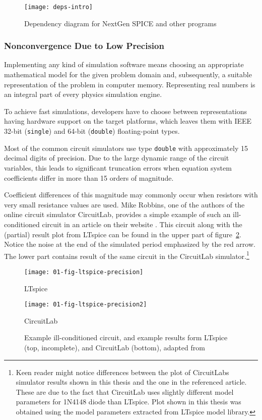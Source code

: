 \begin{figure}[h]
	\centering
	\texttt{[image: deps-intro]}
	\caption{Dependency diagram for NextGen SPICE and other programs}
	\label{fig:deps}
\end{figure}


\subsubsection*{Nonconvergence Due to Low Precision}
\label{chap:intro:dd}
Implementing any kind of simulation software means choosing an appropriate mathematical model for the given problem domain and, subsequently, a suitable representation of the problem in computer memory. Representing real numbers is an integral part of every physics simulation engine.

To achieve fast simulations, developers have to choose between representations having hardware support on the target platforms, which leaves them with IEEE 32-bit (\texttt{single}) and 64-bit (\texttt{double}) floating-point types. 

Most of the common circuit simulators use type \texttt{double} with approximately 15 decimal digits of precision. Due to the large dynamic range of the circuit variables, this leads to significant truncation errors when equation system coefficients differ in more than 15 orders of magnitude.

Coefficient differences of this magnitude may commonly occur when resistors with very small resistance values are used. Mike Robbins, one of the authors of the online circuit simulator CircuitLab, provides a simple example of such an ill-conditioned circuit in an article on their website \cite{circuitlab_dd}. This circuit along with the (partial) result plot from LTspice can be found in the upper part of figure~\ref{fig:ltspice-precision}. Notice the noise at the end of the simulated period emphasized by the red arrow. The lower part contains result of the same circuit in the CircuitLab simulator.\footnote{Keen reader might notice differences between the plot of CircuitLabs simulator results shown in this thesis and the one in the referenced article. These are due to the fact that CircuitLab uses slightly different model parameters for 1N4148 diode than LTspice. Plot shown in this thesis was obtained using the model parameters extracted from LTspice model library.}

\begin{figure}[h]
	\centering
	\texttt{[image: 01-fig-ltspice-precision]}
	\caption*{LTspice}
	\texttt{[image: 01-fig-ltspice-precision2]}
	\caption*{CircuitLab}
	\caption{Example ill-conditioned circuit, and example results form LTspice (top, incomplete), and CircuitLab (bottom), adapted from \cite{circuitlab_dd}}
	\label{fig:ltspice-precision}
\end{figure}

